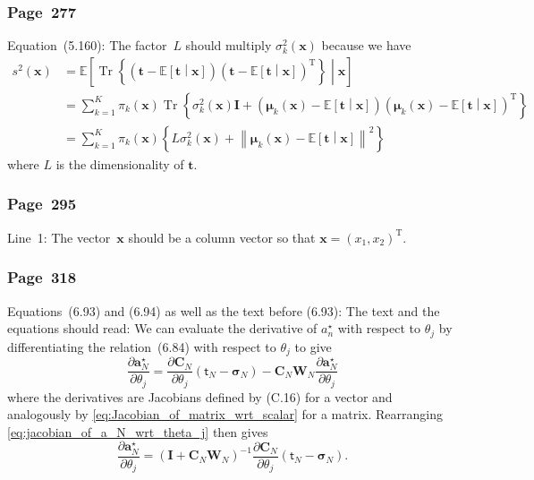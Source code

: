 \documentclass[12pt,a4paper]{article}
\newcommand{\erratum}[1]{\subsubsection*{#1}}
\begin{document}
\erratum{Page~277}
Equation~(5.160):
The factor~$L$ should multiply $\sigma_{k}^{2}(\mathbf{x})$ because we have
\begin{align}
s^2(\mathbf{x}) &=
  \mathbb{E}\left[
    \operatorname{Tr}\left\{
      \left( \mathbf{t} - \mathbb{E}\left[ \mathbf{t} \middle| \mathbf{x} \right] \right)
      \left( \mathbf{t} - \mathbb{E}\left[ \mathbf{t} \middle| \mathbf{x} \right]
        \right)^{\operatorname{T}} \right\}
  \middle| \mathbf{x} \right] \\
&= \sum_{k=1}^{K} \pi_{k}(\mathbf{x})
  \operatorname{Tr}\left\{ \sigma_{k}^{2}(\mathbf{x})\mathbf{I} +
    \left( \bm{\mu}_{k}(\mathbf{x}) -
      \mathbb{E}\left[ \mathbf{t} \middle| \mathbf{x} \right] \right)
    \left( \bm{\mu}_{k}(\mathbf{x}) -
      \mathbb{E}\left[ \mathbf{t} \middle| \mathbf{x} \right] \right)^{\operatorname{T}}
  \right\} \\
&= \sum_{k=1}^{K} \pi_{k}(\mathbf{x})
  \left\{ L \sigma_{k}^{2}(\mathbf{x}) +
    \left\| \bm{\mu}_{k}(\mathbf{x}) -
      \mathbb{E}\left[ \mathbf{t} \middle| \mathbf{x} \right] \right\|^{2}
  \right\}
\end{align}
where $L$ is the dimensionality of $\mathbf{t}$.

\erratum{Page~295}
Line~1:
The vector~$\mathbf{x}$ should be a column vector so that
$\mathbf{x} = \left( x_1, x_2 \right)^{\operatorname{T}}$.

\erratum{Page~318}
Equations~(6.93) and (6.94)
as well as the text before (6.93):
The text and the equations should read:
We can evaluate the derivative of $a_n^{\star}$ with respect to $\theta_j$ by differentiating
the relation~(6.84) with respect to $\theta_j$ to give
\begin{equation}
\frac{\partial \mathbf{a}_N^{\star}}{\partial \theta_j}
 = \frac{\partial\mathbf{C}_N}{\partial \theta_j} \left( \bm{\mathsf{t}}_N - \bm{\sigma}_N \right)
   - \mathbf{C}_N \mathbf{W}_N \frac{\partial \mathbf{a}_N^{\star}}{\partial \theta_j}
   \label{eq:jacobian_of_a_N_wrt_theta_j}
\end{equation}
where the derivatives are Jacobians defined by (C.16) for a vector and
analogously by \eqref{eq:Jacobian_of_matrix_wrt_scalar} for a matrix.
Rearranging \eqref{eq:jacobian_of_a_N_wrt_theta_j} then gives
\begin{equation}
\frac{\partial \mathbf{a}_N^{\star}}{\partial \theta_j}
 = \left( \mathbf{I} + \mathbf{C}_N \mathbf{W}_N \right)^{-1}
   \frac{\partial\mathbf{C}_N}{\partial \theta_j} \left( \bm{\mathsf{t}}_N - \bm{\sigma}_N \right) .
\end{equation}
\end{document}
